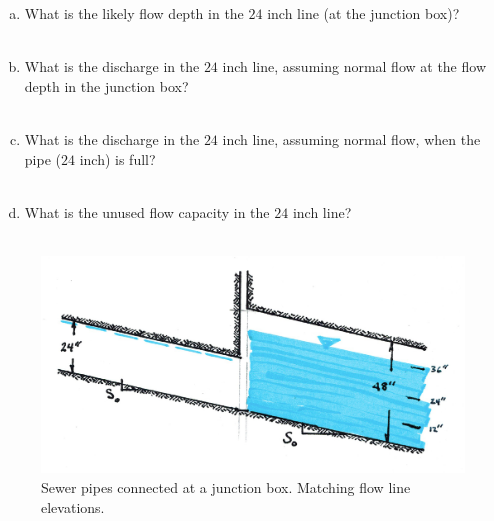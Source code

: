 \documentclass[11pt]{article}
\begin{document}
\begin{enumerate}
\begin{enumerate}[a)]
\item What is the likely flow depth in the $24$ inch line (at the junction box)? \\~\\
\item What is the discharge in the $24$ inch line, assuming normal flow at the flow depth in the junction box? \\~\\
\item What is the discharge in the $24$ inch line, assuming normal flow, when the pipe ($24$ inch) is full? \\~\\
\item What is the unused flow capacity in the $24$ inch line? \\~\\
\end{enumerate}
\begin{figure}[h!] %
\centering
   \includegraphics[width=5in]{SewerPipeMatchFlowlineDeep.jpg}
   \caption{Sewer pipes connected at a junction box.  Matching flow line elevations.}
   \label{fig:SewerPipeMatchFlowlineDeep} 
\end{figure}
\clearpage


~\clearpage







\end{enumerate}
\end{document}

